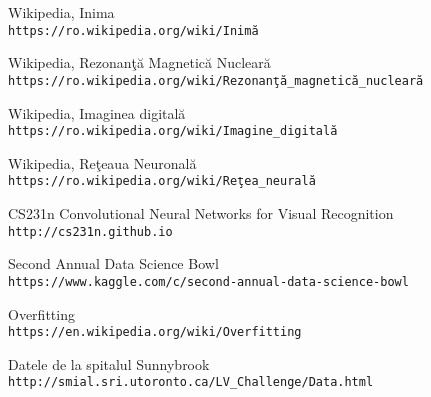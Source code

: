 \begin{thebibliography}{9} 

Wikipedia, Inima
\\\texttt{https://ro.wikipedia.org/wiki/Inim\u{a}}

Wikipedia, Rezonan\c{t}\u{a} Magnetic\u{a} Nuclear\u{a}
\\\texttt{https://ro.wikipedia.org/wiki/Rezonan\c{t}\u{a}\_magnetic\u{a}\_nuclear\u{a}}

Wikipedia, Imaginea digital\u{a}
\\\texttt{https://ro.wikipedia.org/wiki/Imagine\_digital\u{a}}

Wikipedia, Re\c{t}eaua Neuronal\u{a}
\\\texttt{https://ro.wikipedia.org/wiki/Re\c{t}ea\_neural\u{a}}

CS231n Convolutional Neural Networks for Visual Recognition
\\\texttt{http://cs231n.github.io}

Second Annual Data Science Bowl
\\\texttt{https://www.kaggle.com/c/second-annual-data-science-bowl}

Overfitting
\\\texttt{https://en.wikipedia.org/wiki/Overfitting}

Datele de la spitalul Sunnybrook
\\\texttt{http://smial.sri.utoronto.ca/LV\_Challenge/Data.html}

\end{thebibliography}

